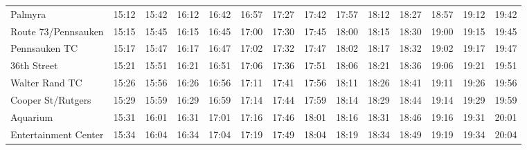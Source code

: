 \begin{center}
\begin{tabular}{@{}lrrrrrrrrrrrrr@{}}
Palmyra & 15:12 & 15:42 & 16:12 & 16:42 & 16:57 & 17:27 & 17:42 & 17:57 & 18:12 & 18:27 & 18:57 & 19:12 & 19:42 \\
Route 73/Pennsauken & 15:15 & 15:45 & 16:15 & 16:45 & 17:00 & 17:30 & 17:45 & 18:00 & 18:15 & 18:30 & 19:00 & 19:15 & 19:45 \\
Pennsauken TC & 15:17 & 15:47 & 16:17 & 16:47 & 17:02 & 17:32 & 17:47 & 18:02 & 18:17 & 18:32 & 19:02 & 19:17 & 19:47 \\
36th Street & 15:21 & 15:51 & 16:21 & 16:51 & 17:06 & 17:36 & 17:51 & 18:06 & 18:21 & 18:36 & 19:06 & 19:21 & 19:51 \\
Walter Rand TC & 15:26 & 15:56 & 16:26 & 16:56 & 17:11 & 17:41 & 17:56 & 18:11 & 18:26 & 18:41 & 19:11 & 19:26 & 19:56 \\
Cooper St/Rutgers & 15:29 & 15:59 & 16:29 & 16:59 & 17:14 & 17:44 & 17:59 & 18:14 & 18:29 & 18:44 & 19:14 & 19:29 & 19:59 \\
Aquarium & 15:31 & 16:01 & 16:31 & 17:01 & 17:16 & 17:46 & 18:01 & 18:16 & 18:31 & 18:46 & 19:16 & 19:31 & 20:01 \\
Entertainment Center & 15:34 & 16:04 & 16:34 & 17:04 & 17:19 & 17:49 & 18:04 & 18:19 & 18:34 & 18:49 & 19:19 & 19:34 & 20:04 \\
\bottomrule\end{tabular}\end{center}
